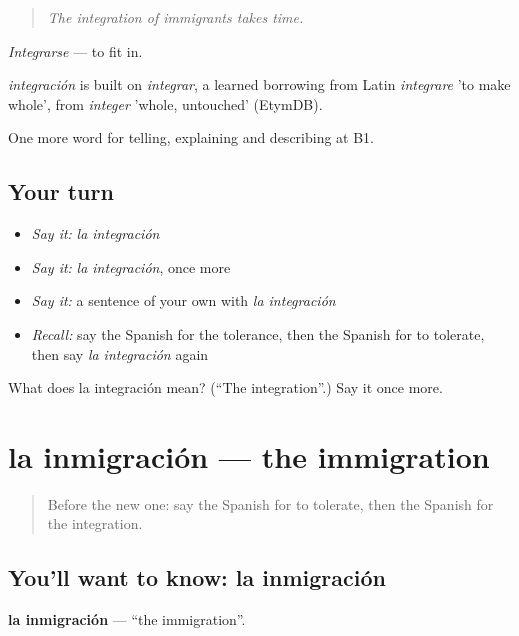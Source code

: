 \begin{quote}
\emph{The integration of immigrants takes time.}
\end{quote}

\emph{Integrarse} — to fit in.

\begin{cousinweb}
\emph{integración} is built on \emph{integrar}, a learned borrowing from Latin \emph{integrare} 'to make whole', from \emph{integer} 'whole, untouched' (EtymDB).
\end{cousinweb}

\begin{grammarlens}[title={What you've built}]
One more word for telling, explaining and describing at B1.
\end{grammarlens}

\subsection*{Your turn}
\begin{itemize}
\raggedright
  \item \emph{Say it:} \emph{la integración}
  \item \emph{Say it:} \emph{la integración}, once more
  \item \emph{Say it:} a sentence of your own with \emph{la integración}
  \item \emph{Recall:} say the Spanish for the tolerance, then the Spanish for to tolerate, then say \emph{la integración} again
\end{itemize}

\begin{tcolorbox}[breakable,colback=teal!4,colframe=teal!35!black,title={Before you move on}]
What does la integración mean? (\textquotedblleft{}The integration\textquotedblright{}.) Say it once more.
\end{tcolorbox}
\section[la inmigración]{la inmigración — the immigration}

\label{lesson:ES-C610-inmigracion}



\begin{quote}
Before the new one: say the Spanish for to tolerate, then the Spanish for the integration.
\end{quote}

\subsection*{You'll want to know: la inmigración}
\textbf{la inmigración} — \textquotedblleft{}the immigration\textquotedblright{}.

